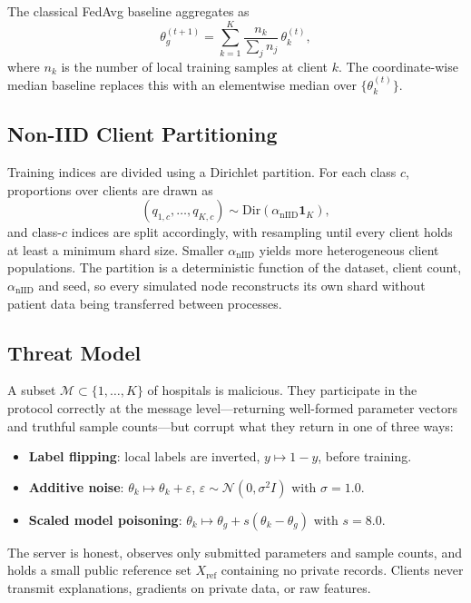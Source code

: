 \documentclass[10pt,twocolumn,letterpaper]{article}
\begin{document}
The classical FedAvg baseline aggregates as
\begin{equation}
 \theta_g^{(t+1)} = \sum_{k=1}^{K} \frac{n_k}{\sum_{j} n_j}\,\theta_k^{(t)},
 \label{eq:fedavg}
\end{equation}
where $n_k$ is the number of local training samples at client $k$. The
coordinate-wise median baseline replaces this with an
elementwise median over $\{\theta_k^{(t)}\}$.

\subsection{Non-IID Client Partitioning}
Training indices are divided using a Dirichlet partition. For each class $c$,
proportions over clients are drawn as
\begin{equation}
 (q_{1,c},\dots,q_{K,c}) \sim \mathrm{Dir}(\alpha_{\mathrm{nIID}} \mathbf{1}_K),
\end{equation}
and class-$c$ indices are split accordingly, with resampling until every
client holds at least a minimum shard size. Smaller
$\alpha_{\mathrm{nIID}}$ yields more heterogeneous client populations. The
partition is a deterministic function of the dataset, client count,
$\alpha_{\mathrm{nIID}}$ and seed, so every simulated node reconstructs its
own shard without patient data being transferred between processes.

\subsection{Threat Model}
A subset $\mathcal{M} \subset \{1,\dots,K\}$ of hospitals is malicious. They
participate in the protocol correctly at the message level---returning
well-formed parameter vectors and truthful sample counts---but corrupt what
they return in one of three ways:
\begin{itemize}
 \item \textbf{Label flipping}: local labels are inverted, $y \mapsto 1-y$,
 before training.
 \item \textbf{Additive noise}: $\theta_k \mapsto \theta_k + \varepsilon$,
 $\varepsilon \sim \mathcal{N}(0, \sigma^{2} I)$ with $\sigma = 1.0$.
 \item \textbf{Scaled model poisoning}: $\theta_k \mapsto \theta_g +
 s(\theta_k - \theta_g)$ with $s = 8.0$.
\end{itemize}
The server is honest, observes only submitted parameters and sample counts,
and holds a small public reference set $X_{\mathrm{ref}}$ containing no
private records. Clients never transmit explanations, gradients on private
data, or raw features.
\end{document}
